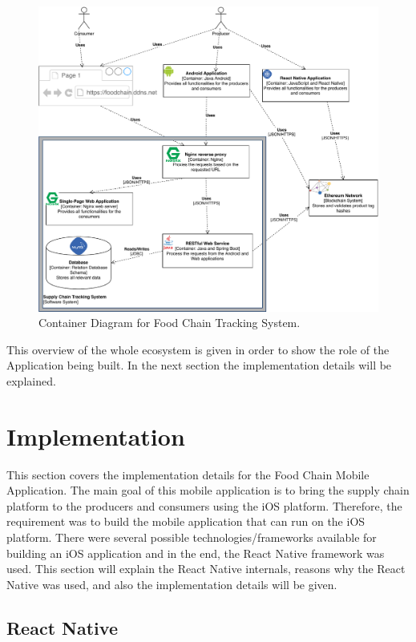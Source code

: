 \begin{figure}[ht]
\includegraphics[width=\linewidth]{figures/container-diagram.pdf}
\caption{Container Diagram for Food Chain Tracking System.}
\label{fig:container-diagram}
\end{figure}

This overview of the whole ecosystem is given in order to show the role of the Application being built. In the next section the implementation details will be explained. 


\section{Implementation}

This section covers the implementation details for the Food Chain Mobile Application. 
The main goal of this mobile application is to bring the supply chain platform to the producers and consumers using the iOS platform. Therefore, the requirement was to build the mobile application that can run on the iOS platform. There were several possible technologies/frameworks available for building an iOS application and in the end, the React Native framework was used. This section will explain the React Native internals, reasons why the React Native was used, and also the implementation details will be given. 

\subsection{React Native}

